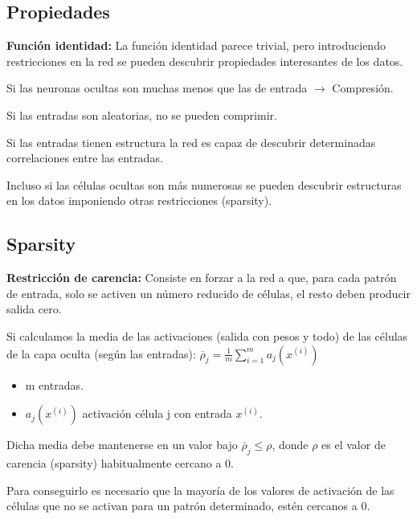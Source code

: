 \documentclass[12pt, twoside, openright]{report} %
\begin{document}
\subsection{Propiedades}
\textbf{Función identidad:} La función identidad parece trivial, pero introduciendo restricciones en la red se pueden descubrir propiedades interesantes de los datos.

Si las neuronas ocultas son muchas menos que las de entrada $\rightarrow$ Compresión.

Si las entradas son aleatorias, no se pueden comprimir.

Si las entradas tienen estructura la red es capaz de descubrir determinadas correlaciones entre las entradas.

Incluso si las células ocultas son más numerosas se pueden descubrir estructuras en los datos imponiendo otras restricciones (sparsity).

\subsection{Sparsity}
\textbf{Restricción de carencia:} Consiste en forzar a la red a que, para cada patrón de entrada, solo se activen un número reducido de células, el resto deben producir salida cero.

Si calculamos la media de las activaciones (salida con pesos y todo) de las células de la capa oculta (según las entradas): $\overline{\rho}_j = \frac{1}{m}\sum_{i=1}^{m} a_j(x^{(i)})$
\begin{itemize}
	\item m entradas.
	\item $a_j(x^{(i)})$ activación célula j con entrada $x^{(i)}$.
\end{itemize}

Dicha media debe mantenerse en un valor bajo $\overline{\rho}_j \leq \rho$, donde $\rho$ es el valor de carencia (sparsity) habitualmente cercano a 0.

Para conseguirlo es necesario que la mayoría de los valores de activación de las células que no se activan para un patrón determinado, estén cercanos a 0.
\end{document}
